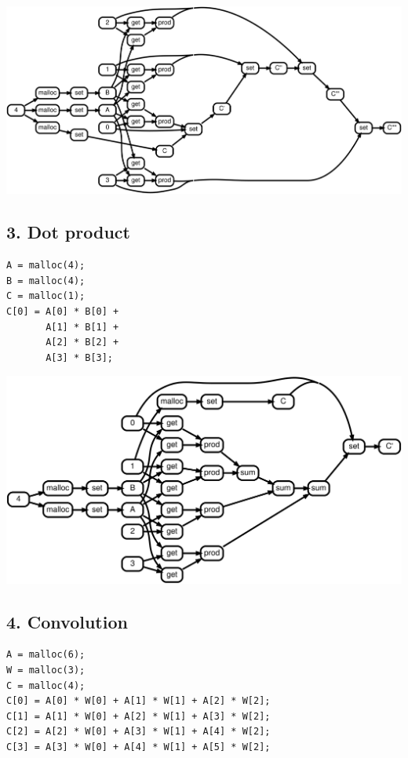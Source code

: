 \documentclass[sigplan,10pt,review,anonymous]{acmart}
\begin{document}
\includegraphics[scale=0.1]{rtd32}

\subsection*{3. Dot product}

\begin{lstlisting}
A = malloc(4);
B = malloc(4);
C = malloc(1);
C[0] = A[0] * B[0] +
       A[1] * B[1] +
       A[2] * B[2] +
       A[3] * B[3];
\end{lstlisting}

\includegraphics[scale=0.1]{rtd33}

\subsection*{4. Convolution}

\begin{lstlisting}
A = malloc(6);
W = malloc(3);
C = malloc(4);
C[0] = A[0] * W[0] + A[1] * W[1] + A[2] * W[2];
C[1] = A[1] * W[0] + A[2] * W[1] + A[3] * W[2];
C[2] = A[2] * W[0] + A[3] * W[1] + A[4] * W[2];
C[3] = A[3] * W[0] + A[4] * W[1] + A[5] * W[2];
\end{lstlisting}
\end{document}
